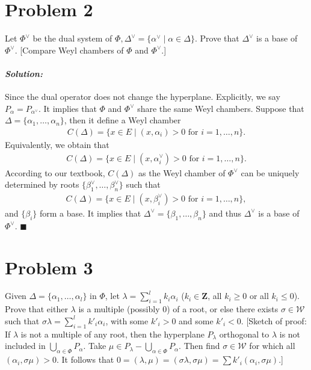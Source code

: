 \documentclass[12pt, a4paper]{article}
\newenvironment{solution}
  {\paragraph{\textit{Solution:}}\par\medskip}
  {\hfill$\blacksquare$\vspace{0.1cm}}
\begin{document}
\section*{Problem 2}
Let $\Phi^\vee$ be the dual system of $\Phi, \Delta^\vee = \{\alpha^\vee \mid \alpha \in \Delta\}$. Prove that $\Delta^\vee$ is a base of $\Phi^\vee$. [Compare Weyl chambers of $\Phi$ and $\Phi^\vee$.]
\begin{solution}
  Since the dual operator does not change the hyperplane. Explicitly, we say $P_{\alpha}=P_{\alpha^\vee}$.
  It implies that $\Phi$ and $\Phi^\vee$ share the same Weyl chambers. 
  Suppose that $\Delta=\{\alpha_1,\dots,\alpha_n\}$, then it define a Weyl chamber 
  \begin{align*}
    C(\Delta) = \{x\in E\mid (x,\alpha_i)>0\text{ for }i=1,\dots,n\}.
  \end{align*}
  Equivalently, we obtain that 
  \begin{align*}
    C(\Delta) = \{x\in E\mid (x,\alpha^\vee_i)>0\text{ for }i=1,\dots,n\}.
  \end{align*}
  According to our textbook, $C(\Delta)$ as the Weyl chamber of $\Phi^\vee$ can be uniquely determined by roots $\{\beta_1^\vee,\dots,\beta_n^\vee\}$ such that 
    \begin{align*}
    C(\Delta) = \{x\in E\mid (x,\beta^\vee_i)>0\text{ for }i=1,\dots,n\},
  \end{align*}
  and $\{\beta_i\}$ form a base. It implies that $\Delta^\vee=\{\beta_1,\dots,\beta_n\}$ and thus $\Delta^\vee$ is a base of $\Phi^\vee$.
\end{solution}



\section*{Problem 3}
Given $\Delta = \{\alpha_1, \dots, \alpha_l\}$ in $\Phi$, let $\lambda = \sum_{i=1}^l k_i \alpha_i$ ($k_i \in \mathbf{Z}$, all $k_i \ge 0$ or all $k_i \le 0$). Prove that either $\lambda$ is a multiple (possibly 0) of a root, or else there exists $\sigma \in \mathcal{W}$ such that $\sigma \lambda = \sum_{i=1}^l k'_i \alpha_i$, with some $k'_i > 0$ and some $k'_i < 0$. [Sketch of proof: If $\lambda$ is not a multiple of any root, then the hyperplane $P_\lambda$ orthogonal to $\lambda$ is not included in $\bigcup_{\alpha \in \Phi} P_\alpha$. Take $\mu \in P_\lambda - \bigcup_{\alpha \in \Phi} P_\alpha$. Then find $\sigma \in \mathcal{W}$ for which all $(\alpha_i, \sigma \mu) > 0$. It follows that $0 = (\lambda, \mu) = (\sigma \lambda, \sigma \mu) = \sum k'_i (\alpha_i, \sigma \mu)$.]
\end{document}
